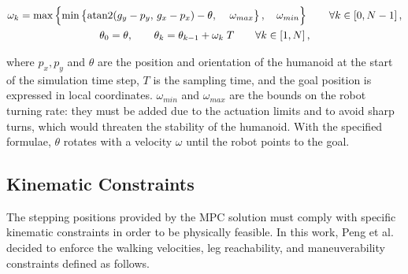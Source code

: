 \documentclass[main.tex]{subfiles}
\begin{document}
\begin{gather}
\omega_k = \max \left\{ \min \left\{ \operatorname{atan2}(g_y - p_y,\, g_x - p_x) - \theta,\, \quad \omega_{max} \right\} ,\quad \omega_{min} \right\} \qquad \forall k \in \left[0, N-1 \right], \notag \\
\theta_0 = \theta, \qquad \theta_k = \theta_{k-1} + \omega_k\;T \qquad \forall k \in \left[1, N\right], \notag
\end{gather}

where $p_x, p_y$ and $\theta$ are the position and orientation of the humanoid at the start of the simulation time step, $T$ is the sampling time, and the goal position is expressed in local coordinates. $\omega_{min}$ and $\omega_{max}$ are the bounds on the robot turning rate: they must be added due to the actuation limits and to avoid sharp turns, which would threaten the stability of the humanoid. With the specified formulae, $\theta$ rotates with a velocity $\omega$ until the robot points to the goal.

\subsection{Kinematic Constraints}
The stepping positions provided by the MPC solution must comply with specific kinematic constraints in order to be physically feasible. In this work, Peng et al. decided to enforce the walking velocities, leg reachability, and maneuverability constraints defined as follows.
\end{document}

